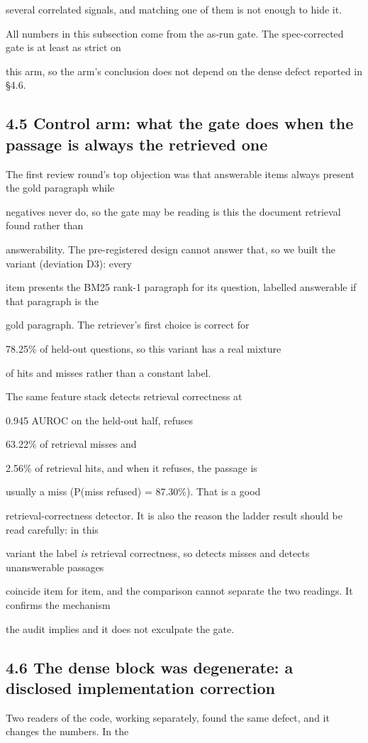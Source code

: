 several correlated signals, and matching one of them is not enough to hide it.

All numbers in this subsection come from the as-run gate. The spec-corrected gate is at least as strict on

this arm, so the arm's conclusion does not depend on the dense defect reported in §4.6.

\subsection{4.5 Control arm: what the gate does when the passage is always the retrieved one}
The first review round's top objection was that answerable items always present the gold paragraph while

negatives never do, so the gate may be reading is this the document retrieval found rather than

answerability. The pre-registered design cannot answer that, so we built the variant (deviation D3): every

item presents the BM25 rank-1 paragraph for its question, labelled answerable if that paragraph is the

gold paragraph. The retriever's first choice is correct for

78.25\% of held-out questions, so this variant has a real mixture

of hits and misses rather than a constant label.

The same feature stack detects retrieval correctness at

0.945 AUROC on the held-out half, refuses

63.22\% of retrieval misses and

2.56\% of retrieval hits, and when it refuses, the passage is

usually a miss (P(miss refused) = 87.30\%). That is a good

retrieval-correctness detector. It is also the reason the ladder result should be read carefully: in this

variant the label \textit{is} retrieval correctness, so detects misses and detects unanswerable passages

coincide item for item, and the comparison cannot separate the two readings. It confirms the mechanism

the audit implies and it does not exculpate the gate.

\subsection{4.6 The dense block was degenerate: a disclosed implementation correction}
Two readers of the code, working separately, found the same defect, and it changes the numbers. In the

